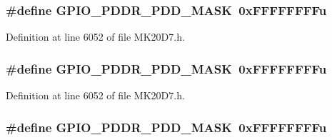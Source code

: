 \subsubsection[{\texorpdfstring{G\+P\+I\+O\+\_\+\+P\+D\+D\+R\+\_\+\+P\+D\+D\+\_\+\+M\+A\+SK}{GPIO_PDDR_PDD_MASK}}]{\setlength{\rightskip}{0pt plus 5cm}\#define G\+P\+I\+O\+\_\+\+P\+D\+D\+R\+\_\+\+P\+D\+D\+\_\+\+M\+A\+SK~0x\+F\+F\+F\+F\+F\+F\+F\+Fu}\hypertarget{group___g_p_i_o___register___masks_ga67567a60f48d2bfb5584cd8de8936788}{}\label{group___g_p_i_o___register___masks_ga67567a60f48d2bfb5584cd8de8936788}


Definition at line 6052 of file M\+K20\+D7.\+h.

\subsubsection[{\texorpdfstring{G\+P\+I\+O\+\_\+\+P\+D\+D\+R\+\_\+\+P\+D\+D\+\_\+\+M\+A\+SK}{GPIO_PDDR_PDD_MASK}}]{\setlength{\rightskip}{0pt plus 5cm}\#define G\+P\+I\+O\+\_\+\+P\+D\+D\+R\+\_\+\+P\+D\+D\+\_\+\+M\+A\+SK~0x\+F\+F\+F\+F\+F\+F\+F\+Fu}\hypertarget{group___g_p_i_o___register___masks_ga67567a60f48d2bfb5584cd8de8936788}{}\label{group___g_p_i_o___register___masks_ga67567a60f48d2bfb5584cd8de8936788}


Definition at line 6052 of file M\+K20\+D7.\+h.

\subsubsection[{\texorpdfstring{G\+P\+I\+O\+\_\+\+P\+D\+D\+R\+\_\+\+P\+D\+D\+\_\+\+M\+A\+SK}{GPIO_PDDR_PDD_MASK}}]{\setlength{\rightskip}{0pt plus 5cm}\#define G\+P\+I\+O\+\_\+\+P\+D\+D\+R\+\_\+\+P\+D\+D\+\_\+\+M\+A\+SK~0x\+F\+F\+F\+F\+F\+F\+F\+Fu}\hypertarget{group___g_p_i_o___register___masks_ga67567a60f48d2bfb5584cd8de8936788}{}\label{group___g_p_i_o___register___masks_ga67567a60f48d2bfb5584cd8de8936788}



